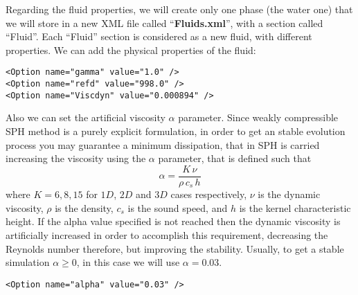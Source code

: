 %
Regarding the fluid properties, we will create only one phase (the water one) that we will store in a new XML file
called ``\textbf{Fluids.xml}'', with a section called ``Fluid''. Each ``Fluid'' section is considered as a new
fluid, with different properties.\rc
%
We can add the physical properties of the fluid:
%
\begin{verbatim}
<Option name="gamma" value="1.0" />
<Option name="refd" value="998.0" />
<Option name="Viscdyn" value="0.000894" />
\end{verbatim}
%
Also we can set the artificial viscosity $\alpha$ parameter. Since weakly compressible SPH method is a purely
explicit formulation, in order to get an stable evolution process you may guarantee a minimum dissipation, that
in SPH is carried increasing the viscosity using the $\alpha$ parameter, that is defined such that
%
\[
\alpha=\frac{K \, \nu}{\rho \, c_s \, h}
\]
%
where $K=6,8,15$ for $1D$, $2D$ and $3D$ cases respectively, $\nu$ is the dynamic viscosity, $\rho$ is the density,
$c_s$ is the sound speed, and $h$ is the kernel characteristic height. If the alpha value specified is not reached
then the dynamic viscosity is artificially increased in order to accomplish this requirement, decreasing the Reynolds
number therefore, but improving the stability. Usually, to get a stable simulation $\alpha \ge 0$, in this case we
will use $\alpha = 0.03$.
%
\begin{verbatim}
<Option name="alpha" value="0.03" />
\end{verbatim}
%
